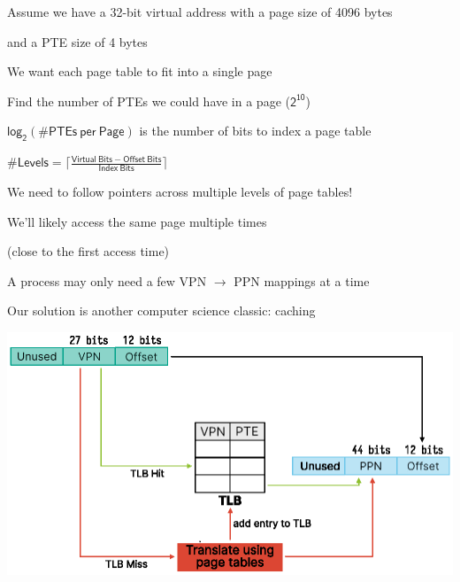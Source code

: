 \begin{slide}


    Assume we have a 32-bit virtual address with a page size of 4096 bytes

    \leftspace{}and a PTE size of 4 bytes
    \medskip

    We want each page table to fit into a single page

    \leftspace{}Find the number of PTEs we could have in a page ($\mathsf{2^{10}}$)

    \leftspace{}\leftspace{}$\mathsf{log_2(\# PTEs\ per\ Page)}$ is the number of bits to index a page table
    \medskip

    $\mathsf{\# Levels = \lceil \frac{Virtual\ Bits - Offset\ Bits}{Index\ Bits} \rceil}$
    \medskip


\end{slide}

\begin{slide}


    We need to follow pointers across multiple levels of page tables!
    \medskip

    We'll likely access the same page multiple times
    
    (close to the first access time)
    \medskip

    A process may only need a few VPN $\rightarrow$ PPN mappings at a time
    \medskip

    Our solution is another computer science classic: caching

\end{slide}

\begin{slide}


    \centering
    \includegraphics{tlb.eps}

\end{slide}

